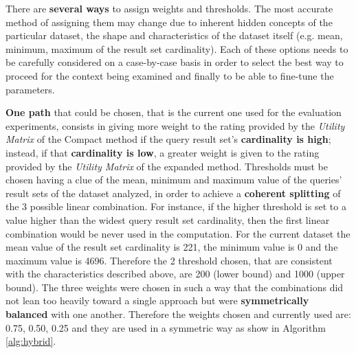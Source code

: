 There are \textbf{several ways} to assign weights and thresholds. The most accurate method of assigning them may change due to inherent hidden concepts of the particular dataset, the shape and characteristics of the dataset itself (e.g. mean, minimum, maximum of the result set cardinality). 
Each of these options needs to be carefully considered on a case-by-case basis in order to select the best way to proceed for the context being examined and finally to be able to fine-tune the parameters.

\textbf{One path} that could be chosen, that is the current one used for the evaluation experiments, consists in giving more weight to the rating provided by the \textit{Utility Matrix} of the Compact method if the query result set’s \textbf{cardinality is high}; instead, if that \textbf{cardinality is low}, a greater weight is given to the rating provided by the \textit{Utility Matrix} of the expanded method.  
Thresholds must be chosen having a clue of the mean, minimum and maximum value of the queries' result sets of the dataset analyzed, in order to achieve a \textbf{coherent splitting} of the 3 possible linear combination. For instance, if the higher threshold is set to a value higher than the widest query result set cardinality, then the first linear combination would be never used in the computation. 
For the current dataset the mean value of the result set cardinality is 221, the minimum value is 0 and the maximum value is 4696. 
Therefore the 2 threshold chosen, that are consistent with the characteristics described above, are 200 (lower bound) and 1000 (upper bound).
The three weights were chosen in such a way that the combinations did not lean too heavily toward a single approach but were \textbf{symmetrically balanced} with one another. Therefore the weights chosen and currently used are: 0.75, 0.50, 0.25 and they are used in a symmetric way as show in Algorithm \ref{alg:hybrid}.



